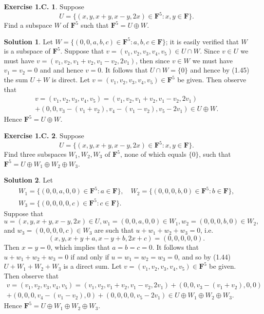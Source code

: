 \documentclass[12pt]{article}
\theoremstyle{definition}
\theoremstyle{exercise}
\newtheorem{exercise}{Exercise 1.C.}
\theoremstyle{solution}
\newtheorem*{solution}{Solution}
\newcommand{\F}{\mathbf{F}}
\begin{document}
\begin{exercise}
\label{ex:21}
    Suppose
    \[
        U = \{ (x, y, x + y, x - y, 2x) \in \F^5 : x, y \in \F \}.
    \]
    Find a subspace \( W \) of \( \F^5 \) such that \( \F^5 = U \oplus W \).
\end{exercise}

\begin{solution}
    Let \( W = \{ (0, 0, a, b, c) \in \F^5 : a, b, c \in \F \} \); it is easily verified that \( W \) is a subspace of \( \F^5 \). Suppose that \( v = (v_1, v_2, v_3, v_4, v_5) \in U \cap W \). Since \( v \in U \) we must have \( v = (v_1, v_2, v_1 + v_2, v_1 - v_2, 2 v_1) \), then since \( v \in W \) we must have \( v_1 = v_2 = 0 \) and and hence \( v = 0 \). It follows that \( U \cap W = \{ 0 \} \) and hence by (1.45) the sum \( U + W \) is direct. Let \( v = (v_1, v_2, v_3, v_4, v_5)\in \F^5 \) be given. Then observe that
    \begin{multline*}
        v = (v_1, v_2, v_3, v_4, v_5) = (v_1, v_2, v_1 + v_2, v_1 - v_2, 2 v_1) \\ + (0, 0, v_3 - (v_1 + v_2), v_4 - (v_1 - v_2), v_5 - 2 v_1) \in U \oplus W.
    \end{multline*}
    Hence \( \F^5 = U \oplus W \).
\end{solution}

\begin{exercise}
\label{ex:22}
    Suppose
    \[
        U = \{ (x, y, x + y, x - y, 2x) \in \F^5 : x, y \in \F \}.
    \]
    Find three subspaces \( W_1, W_2, W_3 \) of \( \F^5 \), none of which equals \( \{ 0 \} \), such that \( \F^5 = U \oplus W_1 \oplus W_2 \oplus W_3 \).
\end{exercise}

\begin{solution}
    Let
    \begin{gather*}
        W_1 = \{ (0, 0, a, 0, 0) \in \F^5 : a \in \F \}, \quad W_2 = \{ (0, 0, 0, b, 0) \in \F^5 : b \in \F \}, \\
        W_3 = \{ (0, 0, 0, 0, c) \in \F^5 : c \in \F \}.
    \end{gather*}
    Suppose that \( u = (x, y, x + y, x - y, 2x) \in U, w_1 = (0, 0, a, 0, 0) \in W_1, w_2 = (0, 0, 0, b, 0) \in W_2, \) and \( w_3 = (0, 0, 0, 0, c) \in W_3 \) are such that \( u + w_1 + w_2 + w_3 = 0 \), i.e.\
    \[
        (x, y, x + y + a, x - y + b, 2x + c) = (0, 0, 0, 0, 0).
    \]
    Then \( x = y = 0 \), which implies that \( a = b = c = 0 \). It follows that \( u + w_1 + w_2 + w_3 = 0 \) if and only if \( u = w_1 = w_2 = w_3 = 0 \), and so by (1.44) \( U + W_1 + W_2 + W_3 \) is a direct sum. Let \( v = (v_1, v_2, v_3, v_4, v_5)\in \F^5 \) be given. Then observe that
    \begin{multline*}
        v = (v_1, v_2, v_3, v_4, v_5) = (v_1, v_2, v_1 + v_2, v_1 - v_2, 2 v_1) + (0, 0, v_3 - (v_1 + v_2), 0, 0) \\ + (0, 0, 0, v_4 - (v_1 - v_2), 0) + (0, 0, 0, 0, v_5 - 2 v_1) \in U \oplus W_1 \oplus W_2 \oplus W_3.
    \end{multline*}
    Hence \( \F^5 = U \oplus W_1 \oplus W_2 \oplus W_3 \).
\end{solution}
\end{document}
